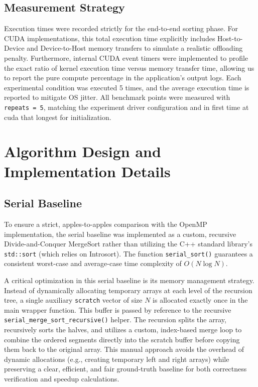 \documentclass[12pt, a4paper]{article}
\begin{document}
\subsection{Measurement Strategy}
Execution times were recorded strictly for the end-to-end sorting phase. For CUDA implementations, this total execution time explicitly includes Host-to-Device and Device-to-Host memory transfers to simulate a realistic offloading penalty. Furthermore, internal CUDA event timers were implemented to profile the exact ratio of kernel execution time versus memory transfer time, allowing us to report the pure compute percentage in the application's output logs. Each experimental condition was executed 5 times, and the average execution time is reported to mitigate OS jitter. All benchmark points were measured with \texttt{repeats = 5}, matching the experiment driver configuration and in first time at cuda that longest for initialization.

\section{Algorithm Design and Implementation Details}

\subsection{Serial Baseline}
To ensure a strict, apples-to-apples comparison with the OpenMP implementation, the serial baseline was implemented as a custom, recursive Divide-and-Conquer MergeSort rather than utilizing the C++ standard library's \texttt{std::sort} (which relies on Introsort). The function \texttt{serial\_sort()} guarantees a consistent worst-case and average-case time complexity of $O(N \log N)$.

A critical optimization in this serial baseline is its memory management strategy. Instead of dynamically allocating temporary arrays at each level of the recursion tree, a single auxiliary \texttt{scratch} vector of size $N$ is allocated exactly once in the main wrapper function. This buffer is passed by reference to the recursive \texttt{serial\_merge\_sort\_recursive()} helper. The recursion splits the array, recursively sorts the halves, and utilizes a custom, index-based merge loop to combine the ordered segments directly into the scratch buffer before copying them back to the original array. This manual approach avoids the overhead of dynamic allocations (e.g., creating temporary left and right arrays) while preserving a clear, efficient, and fair ground-truth baseline for both correctness verification and speedup calculations.
\end{document}

